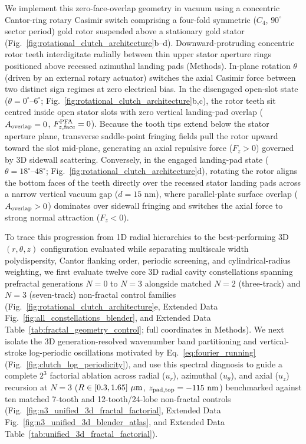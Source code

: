 \documentclass[pdflatex,sn-nature]{sn-jnl}
\begin{document}
We implement this zero-face-overlap geometry in vacuum using a concentric Cantor-ring rotary Casimir switch comprising a four-fold symmetric ($C_4$, $90^\circ$ sector period) gold rotor suspended above a stationary gold stator (Fig.~\ref{fig:rotational_clutch_architecture}b--d). Downward-protruding concentric rotor teeth interdigitate radially between thin upper stator aperture rings positioned above recessed azimuthal landing pads (Methods). In-plane rotation $\theta$ (driven by an external rotary actuator) switches the axial Casimir force between two distinct sign regimes at zero electrical bias. In the disengaged open-slot state ($\theta = 0^\circ\text{--}6^\circ$; Fig.~\ref{fig:rotational_clutch_architecture}b,c), the rotor teeth sit centred inside open stator slots with zero vertical landing-pad overlap ($A_{\rm overlap} = 0$, $F_{z,\rm face}^{\rm PFA} = 0$). Because the tooth tips extend below the stator aperture plane, transverse saddle-point fringing fields pull the rotor upward toward the slot mid-plane, generating an axial repulsive force ($F_z > 0$) governed by 3D sidewall scattering. Conversely, in the engaged landing-pad state ($\theta = 18^\circ\text{--}48^\circ$; Fig.~\ref{fig:rotational_clutch_architecture}d), rotating the rotor aligns the bottom faces of the teeth directly over the recessed stator landing pads across a narrow vertical vacuum gap ($d = 15\text{ nm}$), where parallel-plate surface overlap ($A_{\rm overlap} > 0$) dominates over sidewall fringing and switches the axial force to strong normal attraction ($F_z < 0$).

To trace this progression from 1D radial hierarchies to the best-performing 3D $(r, \theta, z)$ configuration evaluated while separating multiscale width polydispersity, Cantor flanking order, periodic screening, and cylindrical-radius weighting, we first evaluate twelve core 3D radial cavity constellations spanning prefractal generations $N=0$ to $N=3$ alongside matched $N=2$ (three-track) and $N=3$ (seven-track) non-fractal control families (Fig.~\ref{fig:rotational_clutch_architecture}e, Extended Data Fig.~\ref{fig:all_constellations_blender}, and Extended Data Table~\ref{tab:fractal_geometry_control}; full coordinates in Methods). We next isolate the 3D generation-resolved wavenumber band partitioning and vertical-stroke log-periodic oscillations motivated by Eq.~\eqref{eq:fourier_running} (Fig.~\ref{fig:clutch_log_periodicity}), and use this spectral diagnosis to guide a complete $2^3$ factorial ablation across radial ($u_r$), azimuthal ($u_\theta$), and axial ($u_z$) recursion at $N=3$ ($R \in [0.3{}, 1.65{}]\ \mu\text{m}$, $z_{\rm pad,top} = -115\text{ nm}$) benchmarked against ten matched 7-tooth and 12-tooth/24-lobe non-fractal controls (Fig.~\ref{fig:n3_unified_3d_fractal_factorial}, Extended Data Fig.~\ref{fig:n3_unified_3d_blender_atlas}, and Extended Data Table~\ref{tab:unified_3d_fractal_factorial}).
\end{document}
